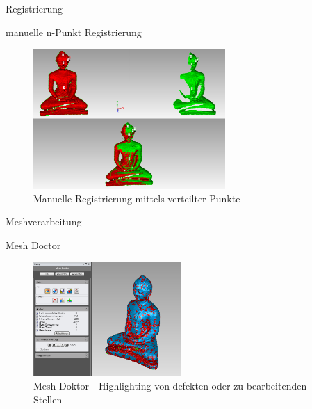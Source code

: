 \begin{frame}{Registrierung}

\begin{block}{manuelle n-Punkt Registrierung}
\begin{figure}[H]
\centering
\includegraphics[width=0.65\textwidth]{images/GeoMagicBudhaPictures/Budha_Scans_Aufrecht_manualRegistration_03.PNG}
\caption{Manuelle Registrierung mittels verteilter Punkte}
\label{fig:budhaManual}
\end{figure}
\end{block}

\end{frame}


\begin{frame}{Meshverarbeitung}

\begin{block}{Mesh Doctor}
\begin{figure}[H]
\centering
\includegraphics[width=0.5\textwidth]{images/GeoMagicBudhaPictures/Budha_MeshDoctor.PNG}
\caption{Mesh-Doktor - Highlighting von defekten oder zu bearbeitenden Stellen}
\label{fig:budhaMeshDoc}
\end{figure}
\end{block}

\end{frame}

